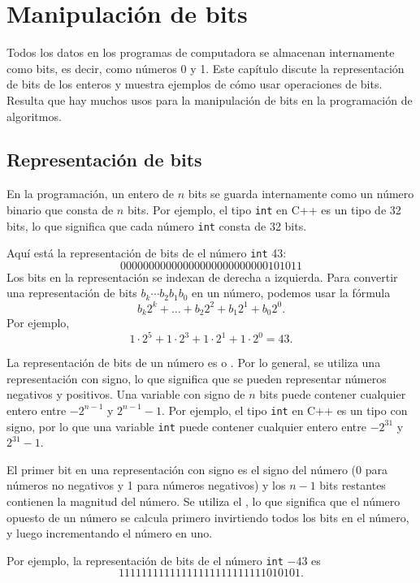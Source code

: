 \chapter{Manipulación de bits}

Todos los datos en los programas de computadora se almacenan internamente como bits,
es decir, como números 0 y 1.
Este capítulo discute la representación de bits
de los enteros y muestra ejemplos
de cómo usar operaciones de bits.
Resulta que hay muchos usos para
la manipulación de bits en la programación de algoritmos.

\section{Representación de bits}


En la programación, un entero de $n$ bits se guarda internamente
como un número binario que consta de $n$ bits.
Por ejemplo, el tipo \texttt{int} en C++ es
un tipo de 32 bits, lo que significa que cada número \texttt{int}
consta de 32 bits.

Aquí está la representación de bits de
el número \texttt{int} 43: 
\[00000000000000000000000000101011\]
Los bits en la representación se indexan de derecha a izquierda.
Para convertir una representación de bits $b_k \cdots b_2 b_1 b_0$ en un número,
podemos usar la fórmula
\[b_k 2^k + \ldots + b_2 2^2 + b_1 2^1 + b_0 2^0.\]
Por ejemplo,
\[1 \cdot 2^5 + 1 \cdot 2^3 + 1 \cdot 2^1 + 1 \cdot 2^0 = 43.\]

La representación de bits de un número es
 o .
Por lo general, se utiliza una representación con signo,
lo que significa que se pueden representar
números negativos y positivos.
Una variable con signo de $n$ bits puede contener cualquier
entero entre $-2^{n-1}$ y $2^{n-1}-1$.
Por ejemplo, el tipo \texttt{int} en C++ es
un tipo con signo, por lo que una variable \texttt{int} puede contener cualquier
entero entre $-2^{31}$ y $2^{31}-1$.

El primer bit en una representación con signo
es el signo del número (0 para números no negativos
y 1 para números negativos) y
los $n-1$ bits restantes contienen la magnitud del número.
Se utiliza el , lo que significa que el
número opuesto de un número se calcula primero
invirtiendo todos los bits en el número,
y luego incrementando el número en uno.

Por ejemplo, la representación de bits de
el número \texttt{int} $-43$ es
\[11111111111111111111111111010101.\]

